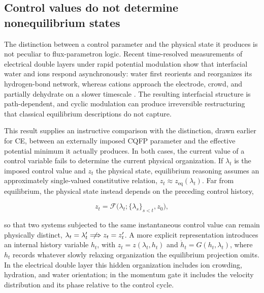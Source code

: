 \documentclass[11pt]{article}
\begin{document}
\subsection{Control values do not determine nonequilibrium states}

The distinction between a control parameter and the physical state it produces is not peculiar to flux-parametron logic. Recent time-resolved measurements of electrical double layers under rapid potential modulation show that interfacial water and ions respond asynchronously: water first reorients and reorganizes its hydrogen-bond network, whereas cations approach the electrode, crowd, and partially dehydrate on a slower timescale \cite{LiEtAl2026EDL}. The resulting interfacial structure is path-dependent, and cyclic modulation can produce irreversible restructuring that classical equilibrium descriptions do not capture.

This result supplies an instructive comparison with the distinction, drawn earlier for CE, between an externally imposed CQFP parameter and the effective potential minimum it actually produces. In both cases, the current value of a control variable fails to determine the current physical organization. If $\lambda_t$ is the imposed control value and $z_t$ the physical state, equilibrium reasoning assumes an approximately single-valued constitutive relation, $z_t\approx z_{\mathrm{eq}}(\lambda_t)$. Far from equilibrium, the physical state instead depends on the preceding control history,

\[
z_t = \mathcal F\bigl(\lambda_t; \{\lambda_s\}_{s<t}, z_0\bigr),
\]

so that two systems subjected to the same instantaneous control value can remain physically distinct, $\lambda_t=\lambda'_t \centernot\Longrightarrow z_t=z'_t$. A more explicit representation introduces an internal history variable $h_t$, with $z_t = z(\lambda_t,h_t)$ and $\dot h_t = G(h_t,\lambda_t)$, where $h_t$ records whatever slowly relaxing organization the equilibrium projection omits. In the electrical double layer this hidden organization includes ion crowding, hydration, and water orientation; in the momentum gate it includes the velocity distribution and its phase relative to the control cycle.
\end{document}
